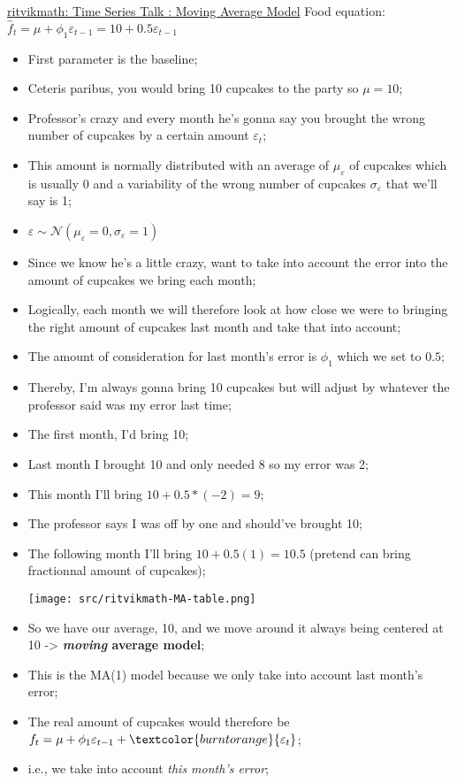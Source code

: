 \documentclass[12pt, titlepage, french]{report}
\begin{document}
\begin{YTB_SUMM}{\href{https://www.youtube.com/watch?v=voryLhxiPzE&list=PLvcbYUQ5t0UHOLnBzl46_Q6QKtFgfMGc3&index=6}{ritvikmath: Time Series Talk : Moving Average Model}}
Food equation: $\hat{f}_{t} = \mu + \phi_{1} \varepsilon_{t - 1} = 10 + 0.5 \varepsilon_{t - 1} $
\begin{itemize}
	\item	First parameter is the baseline;
	\item[]	Ceteris paribus, you would bring 10 cupcakes to the party so $\mu = 10$;
	\item	Professor's crazy and every month he's gonna say you brought the wrong number of cupcakes by a certain amount $\varepsilon_{t}$;
	\item[]	This amount is normally distributed with an average of $\mu_{\varepsilon}$ of cupcakes which is usually 0 and a variability of the wrong number of cupcakes $\sigma_{\varepsilon}$ that we'll say is 1;
	\item	$\varepsilon \sim \mathcal{N}(\mu_{\varepsilon} = 0, \sigma_{\varepsilon} = 1)$
	\item	Since we know he's a little crazy, want to take into account the error into the amount of cupcakes we bring each month;
	\item	Logically, each month we will therefore look at how close we were to bringing the right amount of cupcakes last month and take that into account;
	\item	The amount of consideration for last month's error is $\phi_{1}$ which we set to $0.5$;
	\item[]	Thereby, I'm always gonna bring 10 cupcakes but will adjust by whatever the professor said was my error last time;
	\item[]	The first month, I'd bring 10;
	\item[]	Last month I brought 10 and only needed 8 so my error was 2;
	\item[]	This month I'll bring $10 + 0.5 * (-2) = 9$;
	\item[]	The professor says I was off by one and should've brought 10;
	\item[]	The following month I'll bring $10 + 0.5 (1) = 10.5$ (pretend can bring fractionnal amount of cupcakes);
	
	\texttt{[image: src/ritvikmath-MA-table.png]}
	\item	So we have our average, 10, and we move around it always being centered at 10 -> \textbf{\textit{moving} average model};
	\item	This is the MA(1) model because we only take into account last month's error;
	\item	The real amount of cupcakes would therefore be $f_{t} = \mu + \phi_{1} \varepsilon_{t - 1} + \textcolor{burntorange}{\varepsilon_{t}}$;
	\item[]	i.e., we take into account \textit{this month's error};
\end{itemize}
\end{YTB_SUMM}
\end{document}
